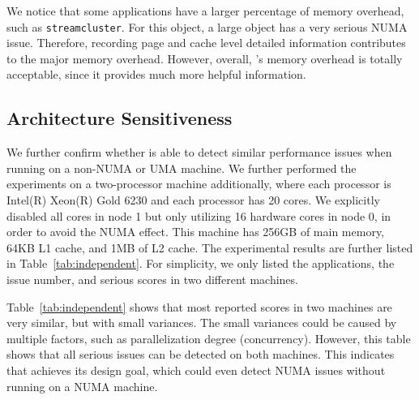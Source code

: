 We notice that some applications have a larger percentage of memory overhead, such as \texttt{streamcluster}. For this object, a large object has a very serious NUMA issue. Therefore, recording page and cache level detailed information contributes to the major memory overhead. However, overall, \NP{}'s memory overhead is totally acceptable, since it provides much more helpful information. 



\subsection{Architecture Sensitiveness}
\label{sec:archindependent}

We further confirm whether \NP{} is able to detect similar performance issues when running on a non-NUMA or UMA machine. We further performed the experiments on a two-processor machine additionally, where each processor is Intel(R) Xeon(R) Gold 6230 and each processor has 20 cores. We explicitly disabled all cores in node 1 but only utilizing 16 hardware cores in node 0, in order to avoid the NUMA effect. This machine has 256GB of main memory, 64KB L1 cache, and 1MB of L2 cache. The experimental results are further listed in Table~\ref{tab:independent}. For simplicity, we only listed the applications, the issue number, and serious scores in two different machines. 

Table~\ref{tab:independent} shows that most reported scores in two machines are very similar, but with small variances. The small variances could be caused by multiple factors, such as parallelization degree (concurrency). However, this table shows that all serious issues can be detected on both machines. This indicates that \NP{} achieves its design goal, which could even detect NUMA issues without running on a NUMA machine. 


